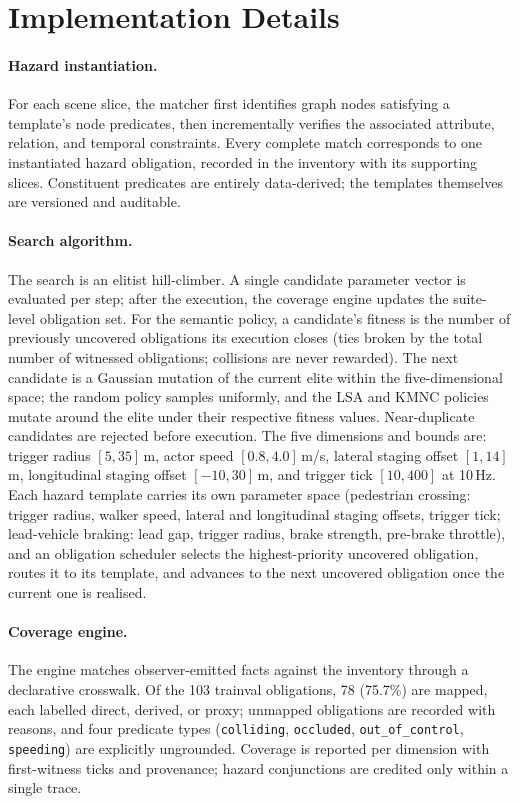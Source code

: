 \documentclass[acmsmall,screen]{acmart}
\begin{document}
\section{Implementation Details}
\label{app:implementation}

\paragraph{Hazard instantiation.}
For each scene slice, the matcher first identifies graph nodes satisfying a
template's node predicates, then incrementally verifies the associated
attribute, relation, and temporal constraints. Every complete match corresponds
to one instantiated hazard obligation, recorded in the inventory with its
supporting slices. Constituent predicates are entirely data-derived; the
templates themselves are versioned and auditable.

\paragraph{Search algorithm.}
The search is an elitist hill-climber. A single candidate parameter vector is
evaluated per step; after the execution, the coverage engine updates the
suite-level obligation set. For the semantic policy, a candidate's fitness is
the number of previously uncovered obligations its execution closes (ties
broken by the total number of witnessed obligations; collisions are never
rewarded). The next candidate is a Gaussian mutation of the current elite
within the five-dimensional space; the random policy samples uniformly, and the
LSA and KMNC policies mutate around the elite under their respective fitness
values. Near-duplicate candidates are rejected before execution. The five
dimensions and bounds are: trigger radius $[5,35]$\,m, actor speed
$[0.8,4.0]$\,m/s, lateral staging offset $[1,14]$\,m, longitudinal staging
offset $[-10,30]$\,m, and trigger tick $[10,400]$ at 10\,Hz. Each hazard template carries its own parameter space
(pedestrian crossing: trigger radius, walker speed, lateral and longitudinal
staging offsets, trigger tick; lead-vehicle braking: lead gap, trigger radius,
brake strength, pre-brake throttle), and an obligation scheduler selects the
highest-priority uncovered obligation, routes it to its template, and advances
to the next uncovered obligation once the current one is realised.

\paragraph{Coverage engine.}
The engine matches observer-emitted facts against the inventory through a
declarative crosswalk. Of the 103 trainval obligations, 78 (75.7\%) are
mapped, each labelled direct, derived, or proxy; unmapped obligations are
recorded with reasons, and four predicate types (\texttt{colliding},
\texttt{occluded}, \texttt{out\_of\_control}, \texttt{speeding}) are explicitly
ungrounded. Coverage is reported per dimension with first-witness ticks and
provenance; hazard conjunctions are credited only within a single trace.
\end{document}
